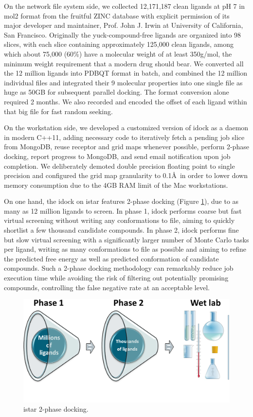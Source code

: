 \documentclass{bioinfo}
\begin{document}
On the network file system side, we collected 12,171,187 clean ligands at pH 7 in mol2 format from the fruitful ZINC database \citep{532,1178} with explicit permission of its major developer and maintainer, Prof. John J. Irwin at University of California, San Francisco. Originally the yuck-compound-free ligands are organized into 98 slices, with each slice containing approximately 125,000 clean ligands, among which about 75,000 (60\%) have a molecular weight of at least 350g/mol, the minimum weight requirement that a modern drug should bear. We converted all the 12 million ligands into PDBQT format in batch, and combined the 12 million individual files and integrated their 9 molecular properties into one single file as huge as 50GB for subsequent parallel docking. The format conversion alone required 2 months. We also recorded and encoded the offset of each ligand within that big file for fast random seeking.

On the workstation side, we developed a customized version of idock as a daemon in modern C++11, adding necessary code to iteratively fetch a pending job slice from MongoDB, reuse receptor and grid maps whenever possible, perform 2-phase docking, report progress to MongoDB, and send email notification upon job completion. We deliberately demoted double precision floating point to single precision and configured the grid map granularity to 0.1\AA\ in order to lower down memory consumption due to the 4GB RAM limit of the Mac workstations.

On one hand, the idock on istar features 2-phase docking (Figure \ref{istar:2PhaseDocking}), due to as many as 12 million ligands to screen. In phase 1, idock performs coarse but fast virtual screening without writing any conformations to file, aiming to quickly shortlist a few thousand candidate compounds. In phase 2, idock performs fine but slow virtual screening with a significantly larger number of Monte Carlo tasks per ligand, writing as many conformations to file as possible and aiming to refine the predicted free energy as well as predicted conformation of candidate compounds. Such a 2-phase docking methodology can remarkably reduce job execution time while avoiding the risk of filtering out potentially promising compounds, controlling the false negative rate at an acceptable level.

\begin{figure}
\centerline{\includegraphics[width=\linewidth]{2PhaseDocking.png}}
\caption{istar 2-phase docking.}\label{istar:2PhaseDocking}
\end{figure}
\end{document}
